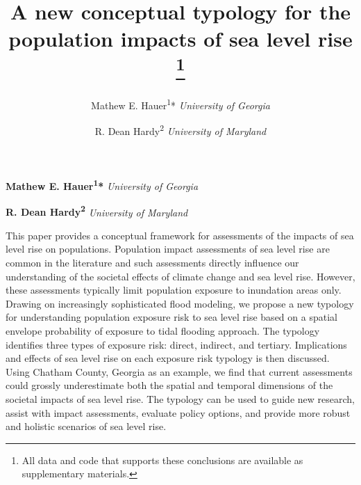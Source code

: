 \documentclass[12pt,]{article}
\title{A new conceptual typology for the population impacts of sea level rise \thanks{All data and code that supports these conclusions are available as
supplementary materials.}  }
\author{\Large Mathew E. Hauer\textsuperscript{1}*\vspace{0.05in} \newline\normalsize\emph{University of Georgia}   \and \Large R. Dean Hardy\textsuperscript{2}\vspace{0.05in} \newline\normalsize\emph{University of Maryland}  }
\date{}
\newcommand*{\authorfont}{\fontfamily{phv}\selectfont}
\renewenvironment{abstract}
 {{%
    \setlength{\leftmargin}{0mm}
    \setlength{\rightmargin}{\leftmargin}%
  }%
  \relax}
 {\endlist}
\begin{document}
	
%

{%
\setlength{\parindent}{0pt}
\thispagestyle{plain}
{\fontsize{18}{20}\selectfont\raggedright 
\maketitle  %

}

{
   \vskip 13.5pt\relax \normalsize\fontsize{11}{12} 
\textbf{\authorfont Mathew E. Hauer\textsuperscript{1}*} \hskip 15pt \emph{\small University of Georgia}   \par \textbf{\authorfont R. Dean Hardy\textsuperscript{2}} \hskip 15pt \emph{\small University of Maryland}   

}

}








\begin{abstract}

    \hbox{\vrule height .2pt width 39.14pc}

    \vskip 8.5pt %

\noindent This paper provides a conceptual framework for assessments of the
impacts of sea level rise on populations. Population impact assessments
of sea level rise are common in the literature and such assessments
directly influence our understanding of the societal effects of climate
change and sea level rise. However, these assessments typically limit
population exposure to inundation areas only. Drawing on increasingly
sophisticated flood modeling, we propose a new typology for
understanding population exposure risk to sea level rise based on a
spatial envelope probability of exposure to tidal flooding approach. The
typology identifies three types of exposure risk: direct, indirect, and
tertiary. Implications and effects of sea level rise on each exposure
risk typology is then discussed. Using Chatham County, Georgia as an
example, we find that current assessments could grossly underestimate
both the spatial and temporal dimensions of the societal impacts of sea
level rise. The typology can be used to guide new research, assist with
impact assessments, evaluate policy options, and provide more robust and
holistic scenarios of sea level rise.


    \hbox{\vrule height .2pt width 39.14pc}


\end{abstract}
\end{document}
